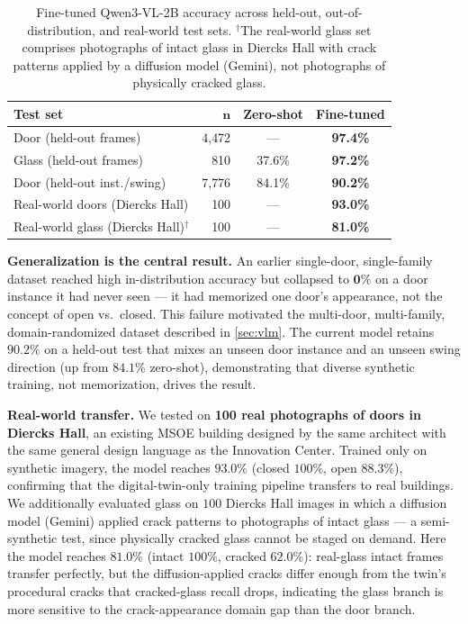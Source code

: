 \documentclass[10pt,twocolumn,letterpaper]{article}
\begin{document}
\begin{table}[t]
  \centering
  \small
  \begin{tabular}{@{}lrcc@{}}
    \toprule
    \textbf{Test set} & $\mathbf{n}$ & \textbf{Zero-shot} & \textbf{Fine-tuned} \\
    \midrule
    Door (held-out frames)         & 4{,}472 & ---     & \textbf{97.4\%} \\
    Glass (held-out frames)        &   810   & 37.6\%  & \textbf{97.2\%} \\
    Door (held-out inst./swing)    & 7{,}776 & 84.1\%  & \textbf{90.2\%} \\
    Real-world doors (Diercks Hall)&   100   & ---     & \textbf{93.0\%} \\
    Real-world glass (Diercks Hall)$^{\dagger}$ & 100 & --- & \textbf{81.0\%} \\
    \bottomrule
  \end{tabular}
  \caption{Fine-tuned Qwen3-VL-2B accuracy across held-out, out-of-distribution,
  and real-world test sets. $^{\dagger}$The real-world glass set comprises
  photographs of intact glass in Diercks Hall with crack patterns applied by a
  diffusion model (Gemini), not photographs of physically cracked glass.}
  \label{tab:vlm}
\end{table}

\noindent\textbf{Generalization is the central result.}
An earlier single-door, single-family dataset reached high in-distribution
accuracy but collapsed to $\mathbf{0\%}$ on a door instance it had never seen ---
it had memorized one door's appearance, not the concept of open vs.\ closed. This
failure motivated the multi-door, multi-family, domain-randomized dataset
described in \cref{sec:vlm}. The current model retains $\mathbf{90.2\%}$ on a
held-out test that mixes an unseen door instance and an unseen swing direction (up
from $84.1\%$ zero-shot), demonstrating that diverse synthetic training, not
memorization, drives the result.

\noindent\textbf{Real-world transfer.}
We tested on \textbf{100 real photographs of doors in Diercks Hall}, an existing
MSOE building designed by the same architect with the same general design language
as the Innovation Center. Trained only on synthetic imagery, the model reaches
$\mathbf{93.0\%}$ (closed $100\%$, open $88.3\%$), confirming that the
digital-twin-only training pipeline transfers to real buildings. We additionally
evaluated glass on $100$ Diercks Hall images in which a diffusion model (Gemini)
applied crack patterns to photographs of intact glass --- a semi-synthetic test,
since physically cracked glass cannot be staged on demand. Here the model reaches
$\mathbf{81.0\%}$ (intact $100\%$, cracked $62.0\%$): real-glass intact frames
transfer perfectly, but the diffusion-applied cracks differ enough from the twin's
procedural cracks that cracked-glass recall drops, indicating the glass branch is
more sensitive to the crack-appearance domain gap than the door branch.
\end{document}

